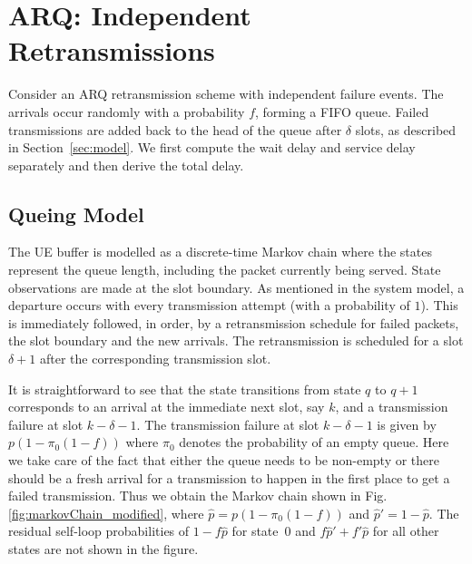 \allowdisplaybreaks
\section{ARQ: Independent Retransmissions}\label{sec:arq}
Consider an ARQ retransmission scheme with independent failure events. The arrivals occur randomly with a probability $f$, forming a FIFO queue. Failed transmissions are added back to the head of the queue after $\delta$ slots, as described in Section~\ref{sec:model}. We first compute the wait delay and service delay separately and then derive the total delay. 

\subsection{Queing Model}
The UE buffer is modelled as a discrete-time Markov chain where the states represent the queue length, including the packet currently being served. State observations are made at the slot boundary. As mentioned in the system model, a departure occurs with every transmission attempt (with a probability of $1$). This is immediately followed, in order, by a retransmission schedule for failed packets, the slot boundary and the new arrivals. The retransmission is scheduled for a slot $\delta+1$ after the corresponding transmission slot. 

It is straightforward to see that the state transitions from state $q$ to $q+1$ corresponds to an arrival at the immediate next slot, say $k$, and a transmission failure at slot $k-\delta-1$. 
The transmission failure at slot $k-\delta-1$ is given by $p\left(1-\pi_0(1-f)\right)$ where $\pi_0$ denotes the probability of an empty queue. Here we take care of the fact that either the queue needs to be non-empty or there should be a fresh arrival for a transmission to happen in the first place to get a failed transmission.
Thus we obtain the Markov chain shown in Fig.\ref{fig:markovChain_modified}, where $\hat{p} = p\left(1-\pi_0(1-f)\right)$ and $\hat{p}' = 1-\hat{p}$. 
The residual self-loop probabilities of $1-f\hat{p}$ for state~0 and $f\hat{p}' + f'\hat{p}$ for all other states are not shown in the figure.

